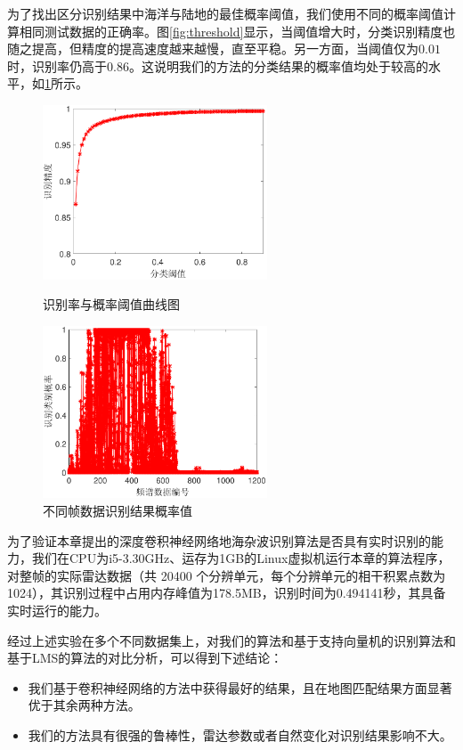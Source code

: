 为了找出区分识别结果中海洋与陆地的最佳概率阈值，我们使用不同的概率阈值计算相同测试数据的正确率。图\ref{fig:threshold}显示，当阈值增大时，分类识别精度也随之提高，但精度的提高速度越来越慢，直至平稳。另一方面，当阈值仅为$0.01$时，识别率仍高于$0.86$。这说明我们的方法的分类结果的概率值均处于较高的水平，如\ref{fig:prob}所示。

\begin{figure}[H]
	\centering
	\begin{minipage}{7cm}
		\centering
		\includegraphics[width=6.67cm]{figures/othr/threashold}
		\caption{识别率与概率阈值曲线图}
		\label{fig:threshold}
	\end{minipage}
	\hspace{10pt}
	\begin{minipage}{7cm}
		\centering
		\includegraphics[width=6.67cm]{figures/othr/prob}
		\caption{不同帧数据识别结果概率值}
		\label{fig:prob}
	\end{minipage}

\end{figure}


为了验证本章提出的深度卷积神经网络地海杂波识别算法是否具有实时识别的能力，我们在CPU为i5-3.30GHz、运存为1GB的Linux虚拟机运行本章的算法程序，对整帧的实际雷达数据（共 20400 个分辨单元，每个分辨单元的相干积累点数为1024），其识别过程中占用内存峰值为178.5MB，识别时间为0.494141秒，其具备实时运行的能力。


经过上述实验在多个不同数据集上，对我们的算法和基于支持向量机的识别算法和基于LMS的算法的对比分析，可以得到下述结论：
\begin{itemize}
	\item 我们基于卷积神经网络的方法中获得最好的结果，且在地图匹配结果方面显著优于其余两种方法。
	\item 我们的方法具有很强的鲁棒性，雷达参数或者自然变化对识别结果影响不大。
\end{itemize}

